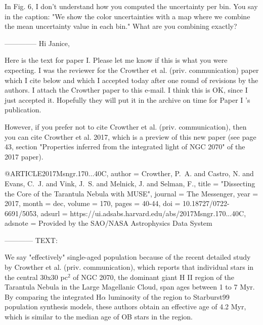 In Fig. 6, I don't understand how you computed the uncertainty per bin. You say in the caption: "We show the color uncertainties with a map where we combine the mean uncertainty value in
each bin." What are you combining exactly?

--------------
Hi Janice,

Here is the text for paper I. Please let me know if this is what you were expecting. I was the reviewer for the Crowther et al. (priv. communication) paper which I cite below and which I accepted today after one round of revisions by the authors. I attach the Crowther paper to this e-mail. I think this is OK, since I just accepted it. Hopefully they will put it in the archive on time for Paper I 's publication. 

However, if you prefer not to cite Crowther et al. (priv. communication), then you can cite Crowther et al. 2017, which is a preview of this new paper (see page 43, section "Properties inferred from the integrated light of NGC 2070" of the 2017 paper).

@ARTICLE{2017Msngr.170...40C,
       author = {{Crowther}, P.~A. and {Castro}, N. and {Evans}, C.~J. and {Vink}, J.~S. and {Melnick}, J. and {Selman}, F.},
        title = "{Dissecting the Core of the Tarantula Nebula with MUSE}",
      journal = {The Messenger},
         year = 2017,
        month = dec,
       volume = {170},
        pages = {40-44},
          doi = {10.18727/0722-6691/5053},
       adsurl = {https://ui.adsabs.harvard.edu/abs/2017Msngr.170...40C},
      adsnote = {Provided by the SAO/NASA Astrophysics Data System}
}

------------
TEXT:

We say "effectively" single-aged population because of the recent detailed study by Crowther et al. (priv. communication), which reports that individual stars in the central 30x30 pc$^2$ of NGC 2070, the dominant giant H II region of the Tarantula Nebula in the Large Magellanic Cloud, span ages between 1 to 7 Myr. By comparing the integrated H$\alpha$ luminosity of the region to Starburst99 \citep{Leitherer1999} population synthesis models, these authors obtain an effective age of 4.2 Myr, which is similar to the median age of OB stars in the region.

